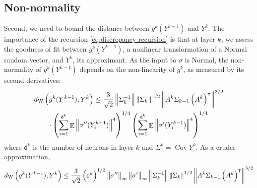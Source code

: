 \documentclass{article}
\DeclareMathOperator{\expect}{\mathbb{E}}
\DeclareMathOperator{\Cov}{\operatorname{Cov}}
\begin{document}
\subsection{Non-normality}
Second, we need to bound the distance between \(g^k(Y^{k-1})\) and \(Y^k\).
The importance of the recursion \eqref{eq:discrepancy-recursion} is that at layer \(k\), we assess the goodness of fit between \(g^k(Y^{k-1})\), a nonlinear transformation of a Normal random vector, and \(Y^k\), its approximant.
As the input to \(\sigma\) is Normal,
the non-normality of \(g^k(Y^{k-1})\) depends on the non-linearity of \(g^k\), as measured by its second derivatives:
\begin{multline}
  d_\mathrm{W}
  \del{g^k(Y^{k-1}), Y^k}
  \leq 
  \frac{3}{\sqrt 2} \left\|\Sigma_{k}^{-1}\right\| \left\|\Sigma_{k}\right\|^{1/2}
  \left\|A^k \Sigma_{k-1} \del{A^k}^\intercal\right\|^{3/2}
  \\
  \cdot
  \del{
    \sum_{i=1}^{\mathsf d^k} \expect \left\|\sigma''(Y^{k-1}_i)\right\|^4
  }^{1/4}
  \del{
    \sum_{i=1}^{\mathsf d^k} \expect \left\|\sigma'(Y^{k-1}_i)\right\|^4
  }^{1/4}
\end{multline}
where \(\mathsf d^k\) is the number of neurons in layer \(k\) and \(\Sigma^k = \Cov Y^k\).
As a cruder approximation,
\begin{align}
  d_\mathrm{W}
  \del{g^k(Y^{k-1}), Y^k}
  \leq 
  \frac{3}{\sqrt 2} \del{\mathsf d^k}^{1/2} \left\|\sigma''\right\|_\infty \left\|\sigma'\right\|_\infty \left\|\Sigma_{k}^{-1}\right\| \left\|\Sigma_{k}\right\|^{1/2}
  \left\|A^k \Sigma_{k-1} \del{A^k}^\intercal\right\|^{3/2}
\end{align}
\end{document}
